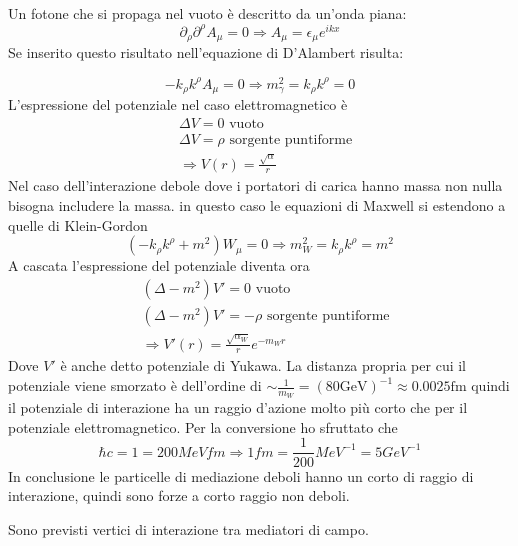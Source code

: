 \documentclass[12pt]{book}
\begin{document}
Un fotone che si propaga nel vuoto è descritto da un'onda piana:
\begin{equation}
	\partial_\rho \partial^\rho A_\mu = 0 \Rightarrow A_\mu =\epsilon_\mu e^{ikx}
\end{equation}
Se inserito questo risultato nell'equazione di D'Alambert risulta:

\begin{equation}
	- k_\rho k^\rho A_\mu =0 \Rightarrow m^2_\gamma =k_\rho k^\rho =0
\end{equation}
L'espressione del potenziale nel caso elettromagnetico è 
\begin{align}
	& \Delta V =0 \text{ vuoto}\\
	& \Delta V = \rho \text{ sorgente puntiforme}\\
	& \Rightarrow V(r) = \frac{\sqrt{\alpha}}{r} 
\end{align}
Nel caso dell'interazione debole dove i portatori di carica hanno massa non nulla bisogna includere la massa. in questo caso le equazioni di Maxwell si estendono a quelle di Klein-Gordon
\begin{equation}
	(- k_\rho k^\rho+\boxed{m^2}) W_\mu =0 \Rightarrow m^2_W =k_\rho k^\rho =m^2
\end{equation} 
A cascata l'espressione del potenziale diventa ora
 \begin{align}
	& (\Delta - \boxed{m^2})V' =0 \text{ vuoto}\\
	& (\Delta - \boxed{m^2}) V' = -\rho \text{ sorgente puntiforme}\\
	& \Rightarrow V'(r) = \frac{\sqrt{\alpha_W}}{r} \boxed{e^{-m_Wr}} 
\end{align}
Dove $V'$ è anche detto potenziale di Yukawa. La distanza propria per cui il potenziale viene smorzato è dell'ordine di $\sim \frac{1}{m_W} = (80 \text{GeV})^{-1} \approx 0.0025 \text{fm}$ quindi il potenziale di interazione ha un raggio d'azione molto più corto che per il potenziale elettromagnetico. Per la conversione ho sfruttato che
\begin{equation}
	\hbar c =1 =200MeV fm \Rightarrow 1 fm = \frac{1}{200}MeV^{-1} = 5 GeV^{-1}
\end{equation}
In conclusione le particelle di mediazione deboli hanno un corto di raggio di interazione, quindi sono forze a corto raggio non deboli.


Sono previsti vertici di interazione tra mediatori di campo.

\newpage
\end{document}
